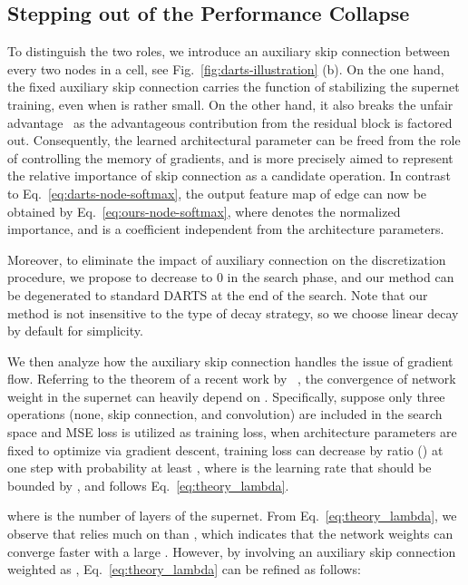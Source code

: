 \documentclass{article} \usepackage{iclr2021_conference,times}
\begin{document}
\subsection{Stepping out of the Performance Collapse}

To distinguish the two roles, we introduce an auxiliary skip connection between every two nodes in a cell, see Fig.~\ref{fig:darts-illustration} (b). 
On the one hand, the fixed auxiliary skip connection carries the function of stabilizing the supernet training, even when  is rather small. On the other hand, it also breaks the unfair advantage~\citep{chu2019fair} as the advantageous contribution from the residual block is factored out. 
Consequently, the learned architectural parameter  can be freed from the role of controlling the memory of gradients, and is more precisely aimed to represent the relative importance of skip connection as a candidate operation. In contrast to Eq.~\ref{eq:darts-node-softmax}, the output feature map of edge  can now be obtained by Eq.~\ref{eq:ours-node-softmax}, where  denotes the normalized importance, and  is a coefficient independent from the architecture parameters.

Moreover, to eliminate the impact of auxiliary connection on the discretization procedure, we propose to decrease  to 0 in the search phase, and our method can be degenerated to standard DARTS at the end of the search.  Note that our method is not insensitive to the type of decay strategy, so we choose linear decay by default  for simplicity.



We then analyze how the auxiliary skip connection handles the issue of gradient flow. Referring to the theorem of a recent work by ~\cite{zhou2020theory}, the convergence of network weight  in the supernet can heavily depend on . Specifically, suppose only three operations (none, skip connection, and convolution) are included in the search space and MSE loss is utilized as training loss, when architecture parameters  are fixed to optimize  via gradient descent, training loss can decrease by ratio () at one step with probability at least , where  is the learning rate that should be bounded by , and  follows Eq.~\ref{eq:theory_lambda}.

where  is the number of layers of the supernet. From Eq.~\ref{eq:theory_lambda}, we observe that  relies much on  than , which indicates that the network weights  can converge faster with a large . 
However, by involving an auxiliary skip connection weighted as , Eq.~\ref{eq:theory_lambda} can be refined as follows:
\end{document}

